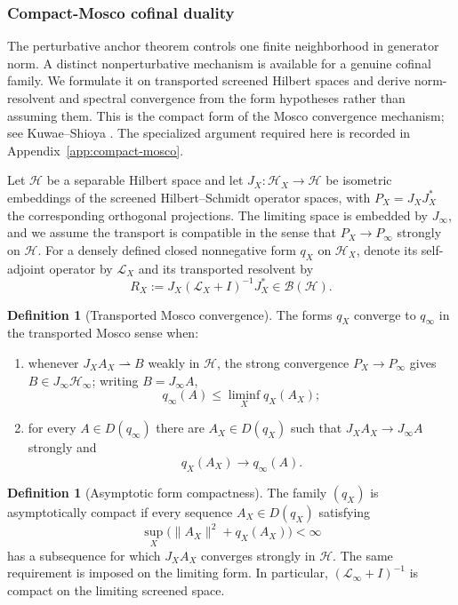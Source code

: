 \documentclass[11pt]{article}
\theoremstyle{definition}
\newtheorem{definition}[theorem]{Definition}
\theoremstyle{remark}
\newcommand{\norm}[1]{\lVert#1\rVert}
\begin{document}
\subsubsection{Compact-Mosco cofinal duality}
\label{sec:compact-mosco}

The perturbative anchor theorem controls one finite neighborhood in generator
norm.  A distinct nonperturbative mechanism is available for a genuine cofinal
family.  We formulate it on transported screened Hilbert spaces and derive
norm-resolvent and spectral convergence from the form hypotheses rather than
assuming them.  This is the compact form of the Mosco convergence mechanism;
see Kuwae--Shioya \cite{KuwaeShioya2003}.  The specialized argument required
here is recorded in Appendix~\ref{app:compact-mosco}.

Let $\mathscr H$ be a separable Hilbert space and let
$J_X:\mathscr H_X\to\mathscr H$ be isometric embeddings of the screened
Hilbert--Schmidt operator spaces, with $P_X=J_XJ_X^*$ the corresponding
orthogonal projections.  The limiting space is embedded by $J_\infty$, and we
assume the transport is compatible in the sense that
$P_X\to P_\infty$ strongly on $\mathscr H$.  For a densely defined closed
nonnegative form $q_X$ on $\mathscr H_X$, denote
its self-adjoint operator by $\mathscr L_X$ and its transported resolvent by
\begin{equation}
R_X:=J_X(\mathscr L_X+I)^{-1}J_X^*\in\mathcal B(\mathscr H).
\label{eq:transported-resolvent}
\end{equation}

\begin{definition}[Transported Mosco convergence]
\label{def:transported-mosco}
The forms $q_X$ converge to $q_\infty$ in the transported Mosco sense when:
\begin{enumerate}[label=\textup{(M\arabic*)},leftmargin=3em]
\item whenever $J_XA_X\rightharpoonup B$ weakly in $\mathscr H$, the strong
      convergence $P_X\to P_\infty$ gives $B\in J_\infty\mathscr H_\infty$;
      writing $B=J_\infty A$,
\[
 q_\infty(A)\le\liminf_X q_X(A_X);
\]
\item for every $A\in D(q_\infty)$ there are $A_X\in D(q_X)$ such that
$J_XA_X\to J_\infty A$ strongly and
\[
 q_X(A_X)\longrightarrow q_\infty(A).
\]
\end{enumerate}
\end{definition}

\begin{definition}[Asymptotic form compactness]
\label{def:asymptotic-compactness}
The family $(q_X)$ is asymptotically compact if every sequence
$A_X\in D(q_X)$ satisfying
\begin{equation}
\sup_X\bigl(\norm{A_X}^2+q_X(A_X)\bigr)<\infty
\label{eq:asymptotic-compactness}
\end{equation}
has a subsequence for which $J_XA_X$ converges strongly in $\mathscr H$.
The same requirement is imposed on the limiting form.  In particular,
$(\mathscr L_\infty+I)^{-1}$ is compact on the limiting screened space.
\end{definition}
\end{document}
